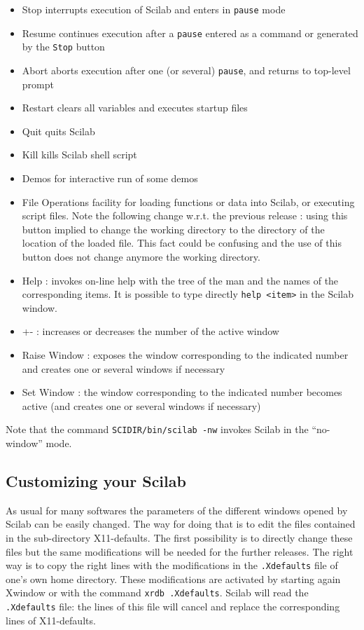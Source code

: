 %
\begin{itemize}
	 \item Stop  	interrupts execution of Scilab and enters in 
{\tt pause} mode
	\item Resume  	continues execution after a {\tt pause} entered as a command or generated by the {\tt Stop} button
	\item Abort 	aborts execution after one (or several) {\tt pause}, 
and returns to top-level prompt
	\item Restart  	clears all variables and executes startup files
	\item Quit  	quits Scilab
	\item Kill  	kills Scilab shell script
	\item Demos  	for interactive run of some demos
	\item File Operations  	facility for loading functions or data into
Scilab, or executing script files. Note the following change w.r.t. the
previous release : using this button implied to 
change the working directory to the directory of the location of the loaded
file. This fact could be confusing and the use of this button does not
change anymore the working directory.
	\item Help : invokes on-line help with the tree of the man and the 
names of the corresponding items. It is possible to type directly 
{\tt help <item>} in the Scilab window.
	\item +- : increases or decreases the number of the active window
	\item Raise Window : exposes the window corresponding to the indicated number and creates one or several windows if necessary
	\item Set Window : the window corresponding to the indicated number becomes active (and creates one or several windows if necessary)
\end{itemize}
%
Note that the command {\tt SCIDIR/bin/scilab -nw} invokes Scilab
in the ``no-window'' mode.

\subsection{Customizing your Scilab}
As usual for many softwares the parameters of the different windows opened by 
Scilab can be easily changed. The way for doing that is to edit the files 
contained in the sub-directory X11-defaults. The first possibility is 
to directly change these files but the same modifications will be needed
for the further releases. The right way is to copy the right lines with the
modifications in the {\tt .Xdefaults} file of one's own home directory.
These modifications are activated by starting again Xwindow or with the
command {\tt xrdb .Xdefaults}. Scilab will read the {\tt .Xdefaults} file: 
the lines of this
file will cancel and replace the corresponding lines of X11-defaults.

